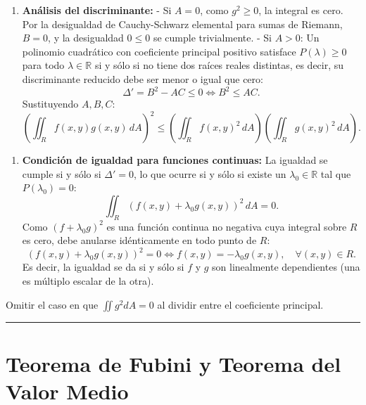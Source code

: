 \documentclass[11pt,a4paper]{article}
\begin{document}
\begin{enumerate}[label=\textbf{\arabic*.}]
\item \textbf{Análisis del discriminante:}
- Si $A = 0$, como $g^2 \ge 0$, la integral es cero. Por la desigualdad de Cauchy-Schwarz elemental para sumas de Riemann, $B = 0$, y la desigualdad $0 \le 0$ se cumple trivialmente.
- Si $A > 0$: Un polinomio cuadrático con coeficiente principal positivo satisface $P(\lambda) \ge 0$ para todo $\lambda \in \mathbb{R}$ si y sólo si no tiene dos raíces reales distintas, es decir, su discriminante reducido debe ser menor o igual que cero:
\begin{equation*}
\Delta' = B^2 - AC \le 0 \iff B^2 \le AC.
\end{equation*}
Sustituyendo $A, B, C$:
\begin{equation*}
\left( \iint_R f(x,y) g(x,y) \, dA \right)^2 \le \left( \iint_R f(x,y)^2 \, dA \right) \left( \iint_R g(x,y)^2 \, dA \right).
\end{equation*}
\end{enumerate}

\begin{enumerate}[label=\textbf{\arabic*.}]
\item \textbf{Condición de igualdad para funciones continuas:}
La igualdad se cumple si y sólo si $\Delta' = 0$, lo que ocurre si y sólo si existe un $\lambda_0 \in \mathbb{R}$ tal que $P(\lambda_0) = 0$:
\begin{equation*}
\iint_R (f(x,y) + \lambda_0 g(x,y))^2 \, dA = 0.
\end{equation*}
Como $(f + \lambda_0 g)^2$ es una función continua no negativa cuya integral sobre $R$ es cero, debe anularse idénticamente en todo punto de $R$:
\begin{equation*}
(f(x,y) + \lambda_0 g(x,y))^2 = 0 \iff f(x,y) = -\lambda_0 g(x,y), \quad \forall (x,y) \in R.
\end{equation*}
Es decir, la igualdad se da si y sólo si $f$ y $g$ son linealmente dependientes (una es múltiplo escalar de la otra).
\end{enumerate}

\begin{trapbox}
Omitir el caso en que $\iint g^2 dA = 0$ al dividir entre el coeficiente principal.
\end{trapbox}

\vspace{0.5cm}
\hrule
\vspace{0.5cm}

\section{Teorema de Fubini y Teorema del Valor Medio}
\end{document}
